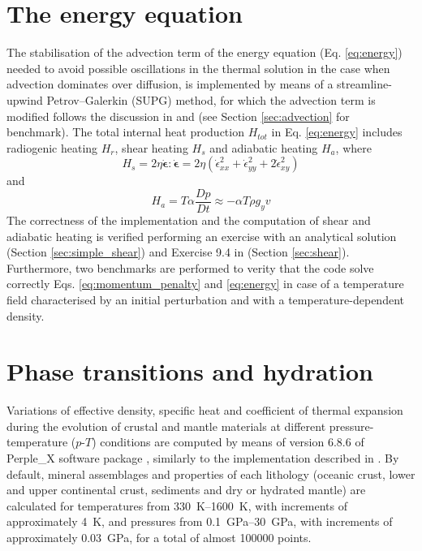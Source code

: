 \documentclass[hidelinks,11pt,a4paper]{article}
\begin{document}
\section{The energy equation}\label{sec:en_eq}
The stabilisation of the advection term of the energy equation (Eq. \ref{eq:energy}) needed to avoid possible oscillations in the thermal solution in the case when advection dominates over diffusion, is implemented by means of a streamline-upwind Petrov–Galerkin (SUPG) method, for which the advection term is modified follows the discussion in \citet{Thieulot2011} and \citet{Thieulot2014} (see Section \ref{sec:advection} for benchmark). The total internal heat production $H_{tot}$ in Eq. \ref{eq:energy} includes radiogenic heating $H_r$, shear heating $H_s$ and adiabatic heating $H_a$, where
\begin{equation}\label{eq:shear}
H_s=2\eta \dot{\bm{\epsilon}} : \dot{\bm{\epsilon}} = 2\eta(\dot{\epsilon}_{xx}^2+\dot{\epsilon}_{yy}^2+2\dot{\epsilon}_{xy}^2)
\end{equation}
and
\begin{equation}\label{eq:adiabatic}
H_a=T \alpha \frac{Dp}{Dt} \approx -\alpha T \rho g_y v
\end{equation}
The correctness of the implementation and the computation of shear and adiabatic heating is verified performing an exercise with an analytical solution (Section \ref{sec:simple_shear}) and Exercise 9.4 in \citet{Gerya2010b} (Section \ref{sec:shear}). Furthermore, two benchmarks are performed to verity that the code solve correctly Eqs. \ref{eq:momentum_penalty} and \ref{eq:energy} in case of a temperature field characterised by an initial perturbation and with a temperature-dependent density.

\section{Phase transitions and hydration}\label{sec:phase}
Variations of effective density, specific heat and coefficient of thermal expansion during the evolution of crustal and mantle materials at different pressure-temperature ($p$-$T$) conditions are computed by means of version 6.8.6 of Perple\_X software package \citep{Connolly2005}, similarly to the implementation described in \citet{Marotta2020}. By default, mineral assemblages and properties of each lithology (oceanic crust, lower and upper continental crust, sediments and dry or hydrated mantle) are calculated for temperatures from \SIrange{330}{1600}{\kelvin}, with increments of approximately \SI{4}{\kelvin}, and pressures from \SIrange{0.1}{30}{\giga\pascal}, with increments of approximately \SI{0.03}{\giga\pascal}, for a total of almost 100000 points.
\end{document}

